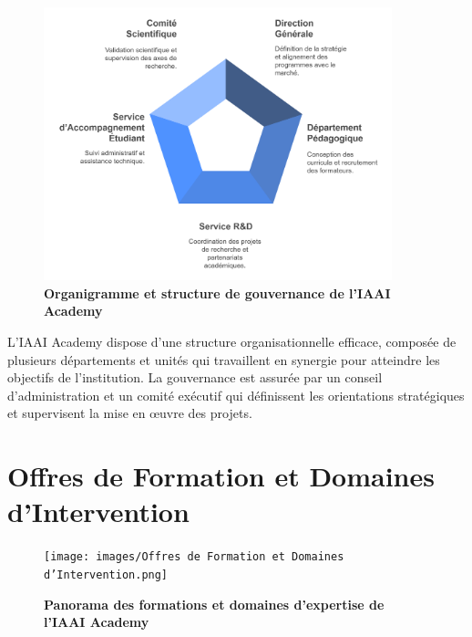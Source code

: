 \begin{figure}[H]
  \centering
  \includegraphics[width=0.9\textwidth]{images/Structure Organisationnelle et Gouvernance.png}
  \caption{\textbf{Organigramme et structure de gouvernance de l'IAAI Academy}}
  \label{fig:structure}
\end{figure}

L'IAAI Academy dispose d'une structure organisationnelle efficace, composée de plusieurs départements et unités qui travaillent en synergie pour atteindre les objectifs de l'institution. La gouvernance est assurée par un conseil d'administration et un comité exécutif qui définissent les orientations stratégiques et supervisent la mise en œuvre des projets.

\section{Offres de Formation et Domaines d'Intervention}

\begin{figure}[H]
  \centering
  \texttt{[image: images/Offres de Formation et Domaines d'Intervention.png]}
  \caption{\textbf{Panorama des formations et domaines d'expertise de l'IAAI Academy}}
  \label{fig:formations}
\end{figure}

